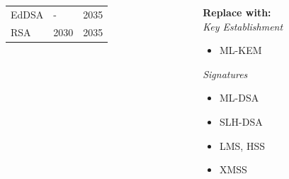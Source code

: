 \documentclass[
aspectratio=169, %
t, %
onlytextwidth, %
10pt, %
]{beamer}
\begin{document}
\begin{frame}
\begin{columns}
\begin{column}{0.58\linewidth}
\begin{table}[]
\begin{tabular}{|l|l|l|}
                    EdDSA & - & 2035 \\
                    RSA & 2030 & 2035 \\
                    \hline
                \end{tabular}
            \end{table}
        \end{column}
        \begin{column}{0.32\linewidth} %
            \newline
            \textbf{Replace with:}\\
            \textit{Key Establishment}
            \vspace{-1em}
            \begin{itemize}
                \item ML-KEM
            \end{itemize}
            \textit{Signatures}
            \vspace{-1em}
            \begin{itemize}
                \item ML-DSA
                \item SLH-DSA
                \item LMS, HSS
                \item XMSS
            \end{itemize}
        \end{column}
    \end{columns}
\end{frame}

\end{document}
